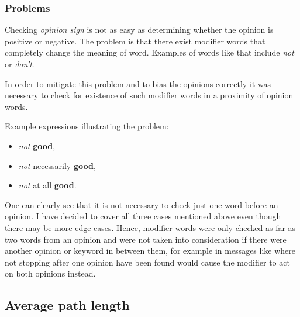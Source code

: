     \subsubsection{Problems}

      Checking \emph{opinion sign} is not as easy as determining whether the opinion is positive or negative. The problem is that there exist modifier words that completely change the meaning of word. Examples of words like that include \emph{not} or \emph{don't}.
      
      In order to mitigate this problem and to bias the opinions correctly it was necessary to check for existence of such modifier words in a proximity of opinion words.
      
      Example expressions illustrating the problem:
      \begin{itemize}
        \item \emph{not} \textbf{good},
        \item \emph{not} necessarily \textbf{good},
        \item \emph{not} at all \textbf{good}.
      \end{itemize}
      One can clearly see that it is not necessary to check just one word before an opinion. I have decided to cover all three cases mentioned above even though there may be more edge cases. Hence, modifier words were only checked as far as two words from an opinion and were not taken into consideration if there were another opinion or keyword in between them, for example in messages like  where not stopping after one opinion have been found would cause the modifier to act on both opinions instead.

  \subsection{Average path length}

